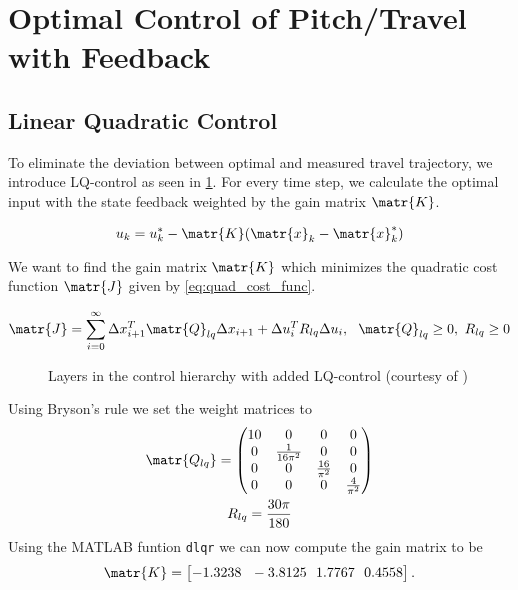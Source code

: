 \section{Optimal Control of Pitch/Travel with Feedback}\label{sec:10_3}

\subsection{Linear Quadratic Control}\label{sec:lq_control}

To eliminate the deviation between optimal and measured travel trajectory, we introduce LQ-control as seen in \cref{fig:layers_closedloop}. For every time step, we calculate the optimal input with the state feedback weighted by the gain matrix $\matr{K}$.

\begin{equation}\label{eq:state_feedback}
    u_k=u_k^*-\matr{K}(\matr{x}_k-\matr{x}_k^*)
\end{equation}


We want to find the gain matrix $\matr{K}$ which minimizes the quadratic cost function $\matr{J}$ given by \eqref{eq:quad_cost_func}.

\begin{align} \label{eq:quad_cost_func}
    \matr{J} = \sum_{i=0}^{\infty}\Delta x_{i+1}^T \matr{Q}_{lq}\Delta x_{i+1}+\Delta u_i^T R_{lq} \Delta u_i, \ \ \matr{Q}_{lq}\geq 0, \ R_{lq}\geq 0
\end{align}
\begin{figure}[h]
	\centering
	
	\caption{Layers in the control hierarchy with added LQ-control (courtesy of \cite{Assignment-text})}
\label{fig:layers_closedloop}
\end{figure}

Using Bryson's rule we set the weight matrices to
\begin{subequations}
    \begin{gather}
    \matr{Q_{lq}}=
    \begin{pmatrix}
    10 & 0 & 0 & 0\\
    0 & \frac{1}{16\pi^2} & 0 & 0 \\
    0 & 0 & \frac{16}{\pi^2} & 0 \\
    0 & 0 & 0 & \frac{4}{\pi^2}
    \end{pmatrix} \\
    R_{lq}=\frac{30 \pi}{180}
    \end{gather}
\end{subequations}
Using the MATLAB funtion \lstinline{dlqr} we can now compute the gain matrix to be
\begin{equation}
    \matr{K}=
    \begin{bmatrix} -1.3238 \ \ -3.8125 \ \ 1.7767 \ \ 0.4558 \end{bmatrix}.
\end{equation}


